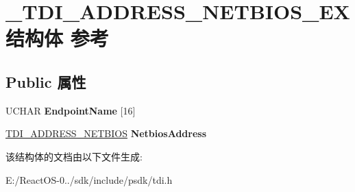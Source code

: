 \hypertarget{struct___t_d_i___a_d_d_r_e_s_s___n_e_t_b_i_o_s___e_x}{}\section{\+\_\+\+T\+D\+I\+\_\+\+A\+D\+D\+R\+E\+S\+S\+\_\+\+N\+E\+T\+B\+I\+O\+S\+\_\+\+E\+X结构体 参考}
\label{struct___t_d_i___a_d_d_r_e_s_s___n_e_t_b_i_o_s___e_x}
\subsection*{Public 属性}
\begin{DoxyCompactItemize}
\item 
\mbox{\label{struct___t_d_i___a_d_d_r_e_s_s___n_e_t_b_i_o_s___e_x_a8afb9fd8599357c6d637f1107dfb0bdb}} 
U\+C\+H\+AR {\bfseries Endpoint\+Name} \mbox{[}16\mbox{]}
\item 
\mbox{\label{struct___t_d_i___a_d_d_r_e_s_s___n_e_t_b_i_o_s___e_x_a21659115a2c922c793c7bc44b688a9d1}} 
\hyperlink{struct___t_d_i___a_d_d_r_e_s_s___n_e_t_b_i_o_s}{T\+D\+I\+\_\+\+A\+D\+D\+R\+E\+S\+S\+\_\+\+N\+E\+T\+B\+I\+OS} {\bfseries Netbios\+Address}
\end{DoxyCompactItemize}


该结构体的文档由以下文件生成\+:\begin{DoxyCompactItemize}
\item 
E\+:/\+React\+O\+S-\/0../sdk/include/psdk/tdi.\+h\end{DoxyCompactItemize}
